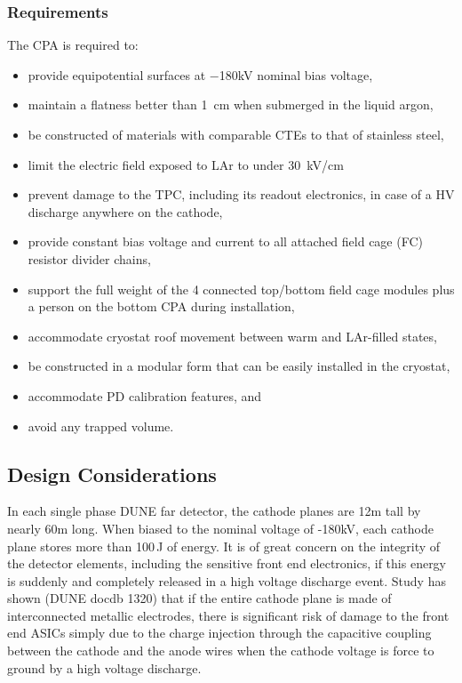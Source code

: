 \subsubsection{Requirements}
The CPA is required to:
\begin{itemize}
\item provide equipotential surfaces at $-$180kV nominal bias voltage,
\item maintain a flatness better than 1~cm when submerged in the liquid argon,
\item be constructed of materials with comparable CTEs to that of stainless steel, 
\item limit the electric field exposed to LAr to under 30~kV/cm 
\item prevent damage to the TPC, including its readout electronics, in case of a HV discharge anywhere on the cathode,
\item provide constant bias voltage and current to all attached field cage (FC) resistor divider chains,
\item support the full weight of the 4 connected top/bottom field cage modules plus a person on the bottom CPA during installation,
\item accommodate cryostat roof movement between warm and LAr-filled states,
\item be constructed in a modular form that can be easily installed in the cryostat,
\item accommodate PD calibration features, and
\item avoid any trapped volume.
\end{itemize}

\subsection{Design Considerations}

In each single phase DUNE far detector, the cathode planes are 12m tall by nearly 60m long.  When biased to the nominal voltage of -180kV, each cathode plane stores more than 100\,J of energy. It is of great concern on the integrity of the detector elements, including the sensitive front end electronics, if this energy is suddenly and completely released in a high voltage discharge event.  Study has shown (DUNE docdb 1320) that if the entire cathode plane is made of interconnected metallic electrodes, there is significant risk of damage to the front end ASICs simply due to the charge injection through the capacitive coupling between the cathode and the anode wires when the cathode voltage is force to ground by a high voltage discharge.  

